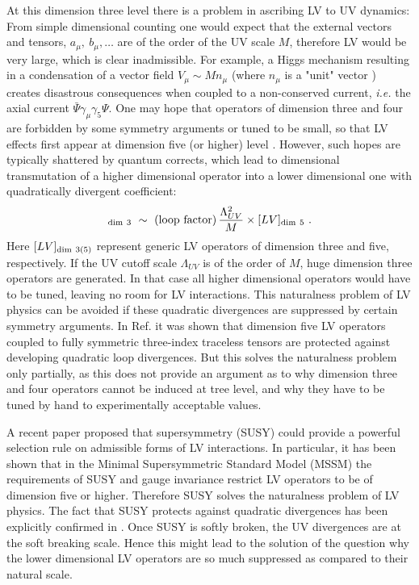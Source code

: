 \documentclass[12pt]{revtex4}
\begin{document}
At this dimension three level there is a problem in ascribing LV to UV
dynamics: From simple dimensional counting  one would expect that the
external vectors and tensors, $a_\mu,~b_\mu,\ldots$ are of the order
of the UV scale $M$, therefore LV would be very large, which is clear
inadmissible. For example, a Higgs mechanism resulting in a
condensation of a vector field $V_{\mu}\sim M n_\mu$ (where $n_\mu$ is a 
"unit" vector \cite{Kostelecky:1989jw}) creates disastrous
consequences when coupled to a non-conserved current, 
{\em i.e.} the axial current $\bar \Psi \gamma_\mu\gamma_5 \Psi$.  
One may hope that operators of dimension three and four are forbidden by 
some symmetry arguments or tuned to be small, so that LV effects 
first appear at dimension five (or higher) level \cite{MP:}. 
However, such hopes are typically shattered by quantum corrects, which
lead to dimensional transmutation of a higher dimensional operator into
a lower dimensional one with quadratically divergent coefficient: 
%
\begin{equation}
[LV]_{\rm dim~3} ~\sim~ ({\rm loop~factor}) \, 
\frac{\Lambda_{UV}^2}{M} 
\times [LV]_{{\rm dim}~5}~. 
\label{transmute}
\end{equation}
%
Here $[LV]_{\rm dim~3(5)}$ represent generic LV operators of dimension
three and five, respectively. If the UV cutoff scale $\Lambda_{UV}$ is
of the order of $M$, huge dimension three operators are generated. In
that case all higher dimensional operators would have to be tuned,
leaving no room for LV interactions. This naturalness problem of LV
physics can be avoided if these quadratic divergences are suppressed
by certain symmetry arguments. In Ref. \cite{MP:} it was shown that
dimension five LV operators coupled to fully symmetric three-index
traceless tensors are protected against developing quadratic loop 
divergences. But this solves the naturalness problem only partially, as
this does not provide an argument as to why dimension three and four
operators cannot be induced at tree level, and why they have to be
tuned by hand to experimentally acceptable values.  


A recent paper \cite{GrootNibbelink:2004za} proposed that
supersymmetry (SUSY) could provide a powerful selection rule on
admissible forms of LV interactions. In particular, it has been shown
that in the Minimal Supersymmetric Standard Model (MSSM) the
requirements of SUSY and gauge invariance restrict LV operators to be
of dimension five or higher. Therefore SUSY solves the naturalness
problem of LV physics. The fact that SUSY protects against quadratic
divergences has been explicitly confirmed in \cite{Jain:2005as}. 
Once SUSY is softly broken, the UV divergences are at the soft
breaking scale. Hence this might lead to the solution of the question
why the lower dimensional LV operators are so much suppressed as
compared to their natural scale. 
\end{document}
